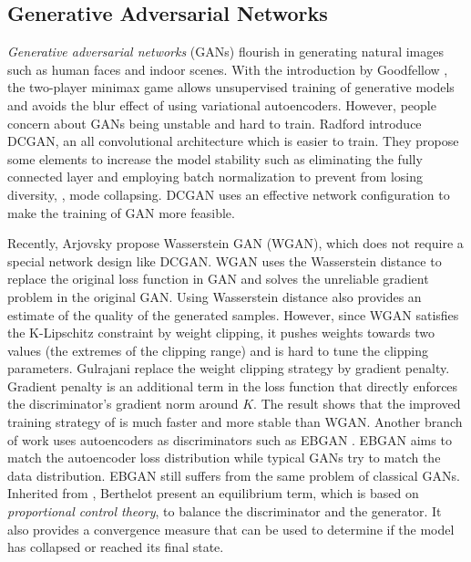 \documentclass[10pt,twocolumn,letterpaper]{article}
\begin{document}
\subsection{Generative Adversarial Networks}

{\em Generative adversarial networks} (GANs) flourish in generating natural images such as human faces and indoor scenes. With the introduction by Goodfellow \etal \cite{GoodfellowPMXWOCB14}, the two-player minimax game allows unsupervised training of generative models and avoids the blur effect of using variational autoencoders. However, people concern about GANs being unstable and hard to train. Radford \etal \cite{RadfordMC15} introduce DCGAN, an all convolutional architecture which is easier to train. They propose some elements to increase the model stability such as eliminating the fully connected layer and employing batch normalization to prevent from losing diversity, \ie, mode collapsing.
DCGAN uses an effective network configuration to make the training of GAN more feasible. 

Recently, Arjovsky \etal \cite{ArjovskyCB17} propose Wasserstein GAN (WGAN), which does not require a special network design like DCGAN. WGAN uses the Wasserstein distance to replace the original loss function in GAN and solves the unreliable gradient problem in the original GAN. Using Wasserstein distance also provides an estimate of the quality of the generated samples. However, since WGAN satisfies the K-Lipschitz constraint by weight clipping, it pushes weights towards two values (the extremes of the clipping range) and is hard to tune the clipping parameters. 
Gulrajani \etal \cite{GulrajaniAADC17} replace the weight clipping strategy by gradient penalty. Gradient penalty is an additional term in the loss function that directly enforces the discriminator's gradient norm around $K$. The result shows that the improved training strategy of \cite{GulrajaniAADC17} is much faster and more stable than WGAN. Another branch of work uses autoencoders as discriminators such as EBGAN \cite{ZhaoML16}. EBGAN aims to match the autoencoder loss distribution while typical GANs try to match the data distribution. EBGAN still suffers from the same problem of classical GANs. Inherited from \cite{ZhaoML16}, Berthelot \etal \cite{BerthelotSM17} present an equilibrium term, which is based on {\em proportional control theory}, to balance the discriminator and the generator. It also provides a convergence measure that can be used to determine if the model has collapsed or reached its final state.
\end{document}
